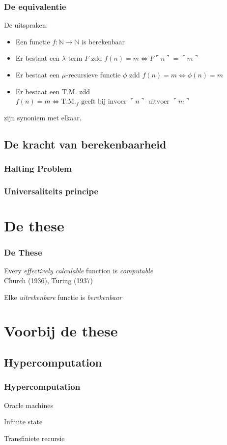 \documentclass{beamer}
\begin{document}
\begin{frame}
    \frametitle{De equivalentie}

    De uitspraken:
    \begin{itemize}
        \item Een functie $f:\mathbb{N} \rightarrow \mathbb{N}$ is berekenbaar
        \item Er bestaat een $\lambda$-term $F$ zdd $f(n) = m \Leftrightarrow F \ulcorner n\urcorner = \ulcorner m\urcorner $
        \item Er bestaat een $\mu$-recursieve functie $\phi$ zdd $f(n) = m \Leftrightarrow \phi(n) = m$
        \item Er bestaat een T.M. zdd $f(n) = m \Leftrightarrow \text{T.M.}_f \text{ geeft bij invoer } \ulcorner n\urcorner \text{ uitvoer } \ulcorner m\urcorner$
    \end{itemize}

    zijn synoniem met elkaar.
\end{frame}

\subsection{De kracht van berekenbaarheid}
\begin{frame}
    \frametitle{Halting Problem}
\end{frame}

\begin{frame}
    \frametitle{Universaliteits principe}
\end{frame}

\section{De these}
\begin{frame}
    \frametitle{De These}
    \begin{center}
        {\Large
            Every \emph{effectively calculable} function is \emph{computable}
        }
        \\
        Church (1936), Turing (1937)

        Elke \emph{uitrekenbare} functie is \emph{berekenbaar}
    \end{center}
\end{frame}


\section{Voorbij de these}
\subsection{Hypercomputation}
\begin{frame}
    \frametitle{Hypercomputation}

    Oracle machines

    Infinite state

    Transfiniete recursie
\end{frame}
\end{document}
